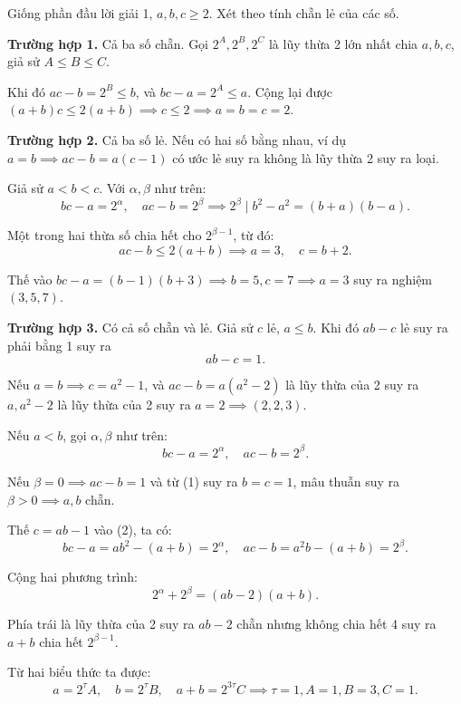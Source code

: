 \begin{problem}
\begin{problem}
\begin{soln}
    Giống phần đầu lời giải 1, \( a, b, c \ge 2 \). Xét theo tính chẵn lẻ của các số.

    \textbf{Trường hợp 1.} Cả ba số chẵn. Gọi \( 2^A, 2^B, 2^C \) là lũy thừa 2 lớn nhất chia \( a, b, c \), giả sử \( A \le B \le C \).

    Khi đó \( ac - b = 2^B \le b \), và \( bc - a = 2^A \le a \). Cộng lại được \( (a + b)c \le 2(a + b) \implies c \le 2 \implies a = b = c = 2 \).

    \textbf{Trường hợp 2.} Cả ba số lẻ. Nếu có hai số bằng nhau, ví dụ \( a = b \implies ac - b = a(c - 1) \) có ước lẻ suy ra không là lũy thừa 2 suy ra loại.

    Giả sử \( a < b < c \). Với \( \alpha, \beta \) như trên:
    \[
        bc - a = 2^\alpha, \quad ac - b = 2^\beta \implies 2^\beta \mid b^2 - a^2 = (b + a)(b - a).
    \]

    Một trong hai thừa số chia hết cho \( 2^{\beta - 1} \), từ đó:
    \[
        ac - b \le 2(a + b) \implies a = 3, \quad c = b + 2.
    \]
    
    Thế vào \( bc - a = (b - 1)(b + 3) \implies b = 5, c = 7 \implies a = 3 \) suy ra nghiệm \( (3, 5, 7) \).

    \textbf{Trường hợp 3.} Có cả số chẵn và lẻ. Giả sử \( c \) lẻ, \( a \le b \). Khi đó \( ab - c \) lẻ suy ra phải bằng 1 suy ra
    \[
        ab - c = 1. \tag{1}
    \]

    Nếu \( a = b \implies c = a^2 - 1 \), và \( ac - b = a(a^2 - 2) \) là lũy thừa của 2
    suy ra \( a, a^2 - 2 \) là lũy thừa của 2 suy ra \( a = 2 \implies (2, 2, 3) \).

    Nếu \( a < b \), gọi \( \alpha, \beta \) như trên:
    \[
        bc - a = 2^\alpha, \quad ac - b = 2^\beta. \tag{2}
    \]

    Nếu \( \beta = 0 \implies ac - b = 1 \) và từ (1) suy ra \( b = c = 1 \), mâu thuẫn suy ra \( \beta > 0 \implies a, b \) chẵn.

    Thế \( c = ab - 1 \) vào (2), ta có:
    \[
        bc - a = ab^2 - (a + b) = 2^\alpha, \quad ac - b = a^2b - (a + b) = 2^\beta.
    \]

    Cộng hai phương trình:
    \[
        2^\alpha + 2^\beta = (ab - 2)(a + b).
    \]

    Phía trái là lũy thừa của 2 suy ra \( ab - 2 \) chẵn nhưng không chia hết 4 suy ra \( a + b \) chia hết \( 2^{\beta - 1} \).

    Từ hai biểu thức ta được:
    \[
        a = 2^\tau A, \quad b = 2^\tau B, \quad a + b = 2^{3\tau}C \implies \tau = 1, A = 1, B = 3, C = 1.
    \]


\end{soln}
\end{problem}
\end{problem}
